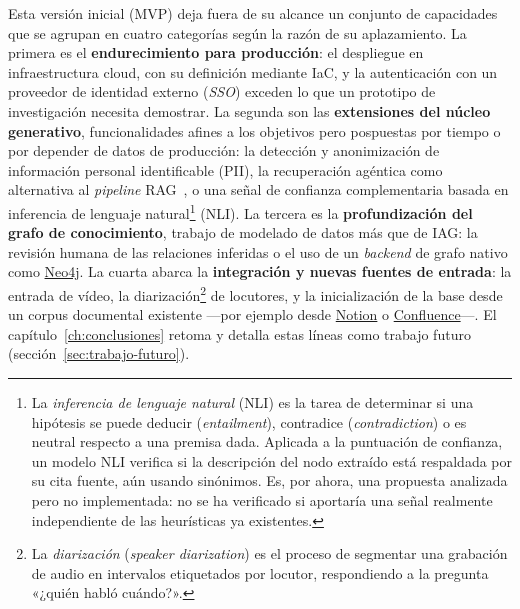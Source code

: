 \bigskip
\noindent Esta versión inicial (\acs{MVP}) deja fuera de su alcance un conjunto de capacidades
que se agrupan en cuatro categorías según la razón de su aplazamiento. La primera es el
\textbf{endurecimiento para producción}: el despliegue en infraestructura cloud, con su definición
mediante \ac{IaC}, y la autenticación con un proveedor de identidad externo
(\textit{SSO}) exceden lo que un prototipo de investigación necesita demostrar. La segunda son las
\textbf{extensiones del núcleo generativo}, funcionalidades afines a los objetivos pero pospuestas
por tiempo o por depender de datos de producción: la detección y anonimización de información
personal identificable (PII), la recuperación agéntica como alternativa al \textit{pipeline}
\ac{RAG}~\cite{yao2023react}, o una señal de confianza complementaria basada en inferencia de
lenguaje natural\footnote{%
  La \textit{inferencia de lenguaje natural} (\ac{NLI}) es la tarea de determinar si una hipótesis
  se puede deducir (\textit{entailment}), contradice (\textit{contradiction}) o es neutral respecto
  a una premisa dada. Aplicada a la puntuación de confianza, un modelo NLI verifica si la descripción
  del nodo extraído está respaldada por su cita fuente, aún usando sinónimos. Es, por ahora, una
  propuesta analizada pero no implementada: no se ha verificado si aportaría una señal realmente
  independiente de las heurísticas ya existentes.%
} (\acs{NLI}). La tercera es la \textbf{profundización del grafo de conocimiento}, trabajo de
modelado de datos más que de \ac{IAG}: la revisión humana de las relaciones inferidas o el uso de un
\textit{backend} de grafo nativo como \href{https://neo4j.com}{Neo4j}. La cuarta abarca la
\textbf{integración y nuevas fuentes de entrada}: la entrada de vídeo, la
diarización\footnote{%
  La \textit{diarización} (\textit{speaker diarization}) es el proceso de segmentar una grabación
  de audio en intervalos etiquetados por locutor, respondiendo a la pregunta «¿quién habló
  cuándo?».%
} de locutores, y la inicialización de la base desde un corpus documental existente —por ejemplo
desde \href{https://www.notion.so}{Notion} o \href{https://www.atlassian.com/software/confluence}{Confluence}—.
El capítulo~\ref{ch:conclusiones} retoma y detalla estas líneas como trabajo futuro
(sección~\ref{sec:trabajo-futuro}).
